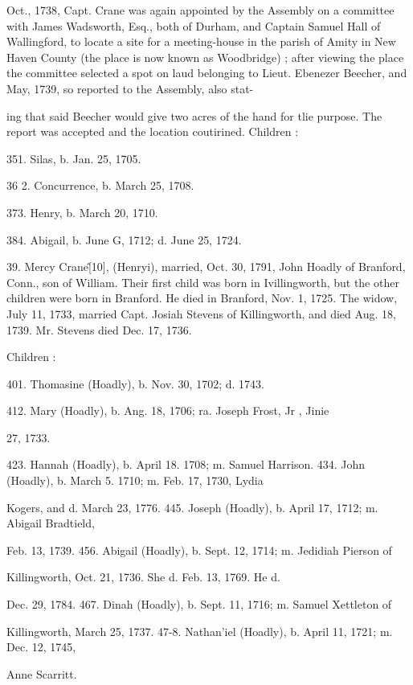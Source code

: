 \documentclass{book}
\begin{document}
Oct., 1738, Capt. Crane was again appointed by the Assembly 
on a committee with James Wadsworth, Esq., both of Durham, 
and Captain Samuel Hall of Wallingford, to locate a site for a 
meeting-house in the parish of Amity in New Haven County (the 
place is now known as Woodbridge) ; after viewing the place the 
committee selected a spot on laud belonging to Lieut. Ebenezer 
Beecher, and May, 1739, so reported to the Assembly, also stat- 




ing that said Beecher would give two acres of the hand for tlie 
purpose. The report was accepted and the location coutirined. 
Children : 

351. Silas, b. Jan. 25, 1705. 

36  2. Concurrence, b. March 25, 1708. 

373. Henry, b. March 20, 1710. 

384. Abigail, b. June G, 1712; d. June 25, 1724. 

39. Mercy Crane\^ [10], (Henryi), married, Oct. 30, 1791, 
John Hoadly of Branford, Conn., son of William. Their first 
child was born in Ivillingworth, but the other children were born 
in Branford. He died in Branford, Nov. 1, 1725. The widow, 
July 11, 1733, married Capt. Josiah Stevens of Killingworth, and 
died Aug. 18, 1739. Mr. Stevens died Dec. 17, 1736. 

Children : 

401. Thomasine (Hoadly), b. Nov. 30, 1702; d. 1743. 

412. Mary (Hoadly), b. Ang. 18, 1706; ra. Joseph Frost, Jr , Jinie 

27, 1733.  

423. Hannah (Hoadly), b. April 18. 1708; m. Samuel Harrison. 
434. John (Hoadly), b. March 5. 1710; m. Feb. 17, 1730, Lydia 

Kogers, and d. March 23, 1776. 
445. Joseph (Hoadly), b. April 17, 1712; m. Abigail Bradtield, 

Feb. 13, 1739. 
456. Abigail (Hoadly), b. Sept. 12, 1714; m. Jedidiah Pierson of 

Killingworth, Oct. 21, 1736. She d. Feb. 13, 1769. He d. 

Dec. 29, 1784. 
467. Dinah (Hoadly), b. Sept. 11, 1716; m. Samuel Xettleton of 

Killingworth, March 25, 1737. 
47-8. Nathan'iel (Hoadly), b. April 11, 1721; m. Dec. 12, 1745, 

Anne Scarritt. 
\end{document}
